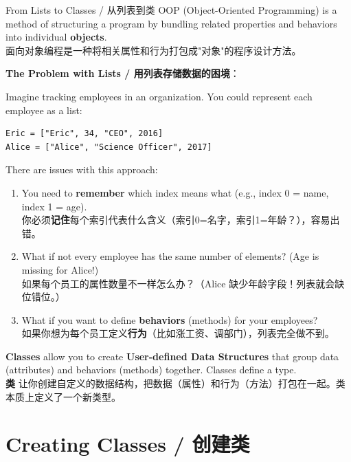 \documentclass[11pt,a4paper]{report}
\begin{document}
\begin{concept}{From Lists to Classes / 从列表到类}
    OOP (Object-Oriented Programming) is a method of structuring a program by bundling related properties and behaviors into individual \textbf{objects}. \\
    面向对象编程是一种将相关属性和行为打包成"对象"的程序设计方法。

    \textbf{The Problem with Lists / 用列表存储数据的困境}：

    Imagine tracking employees in an organization. You could represent each employee as a list:
\begin{lstlisting}
Eric = ["Eric", 34, "CEO", 2016]
Alice = ["Alice", "Science Officer", 2017]
\end{lstlisting}
    There are issues with this approach:
    \begin{enumerate}[itemsep=0.3em]
        \item You need to \textbf{remember} which index means what (e.g., index 0 = name, index 1 = age). \\
        你必须\textbf{记住}每个索引代表什么含义（索引0=名字，索引1=年龄？），容易出错。
        \item What if not every employee has the same number of elements? (Age is missing for Alice!) \\
        如果每个员工的属性数量不一样怎么办？（Alice 缺少年龄字段！列表就会缺位错位。）
        \item What if you want to define \textbf{behaviors} (methods) for your employees? \\
        如果你想为每个员工定义\textbf{行为}（比如涨工资、调部门），列表完全做不到。
    \end{enumerate}

    \textbf{Classes} allow you to create \textbf{User-defined Data Structures} that group data (attributes) and behaviors (methods) together. Classes define a type. \\
    \textbf{类} 让你创建自定义的数据结构，把数据（属性）和行为（方法）打包在一起。类本质上定义了一个新类型。
\end{concept}

\section{Creating Classes / 创建类}
\end{document}
